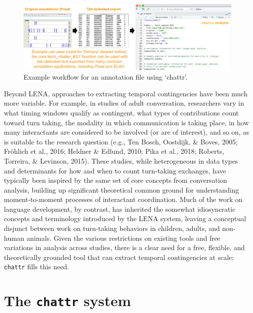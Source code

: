\documentclass[10pt, letterpaper]{article}
\newenvironment{CodeChunk}{}{}
\begin{document}
\begin{CodeChunk}
\begin{figure}[h]

{\centering \includegraphics{figs/workflow-1} 

}

\caption[Example workflow for an annotation file using `chattr']{Example workflow for an annotation file using `chattr'.}\label{fig:workflow}
\end{figure}
\end{CodeChunk}

Beyond LENA, approaches to extracting temporal contingencies have been
much more variable. For example, in studies of adult conversation,
researchers vary in what timing windows qualify as contingent, what
types of contributions count toward turn taking, the modality in which
communication is taking place, in how many interactants are considered
to be involved (or are of interest), and so on, as is suitable to the
research question (e.g., Ten Bosch, Oostdijk, \& Boves, 2005; Fröhlich
et al., 2016; Heldner \& Edlund, 2010; Pika et al., 2018; Roberts,
Torreira, \& Levinson, 2015). These studies, while heterogeneous in data
types and determinants for how and when to count turn-taking exchanges,
have typically been inspired by the same set of core concepts from
conversation analysis, building up significant theoretical common ground
for understanding moment-to-moment processes of interactant
coordination. Much of the work on language development, by contrast, has
inherited the somewhat idiosyncratic concepts and terminology introduced
by the LENA system, leaving a conceptual disjunct between work on
turn-taking behaviors in children, adults, and non-human animals. Given
the various restrictions on existing tools and free variations in
analysis across studies, there is a clear need for a free, flexible, and
theoretically grounded tool that can extract temporal contingencies at
scale; \texttt{chattr} fills this need.

\hypertarget{the-chattr-system}{%
\section{\texorpdfstring{The \texttt{chattr}
system}{The chattr system}}\label{the-chattr-system}}
\end{document}
